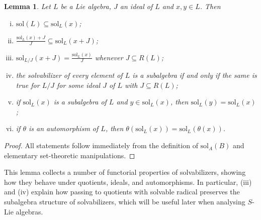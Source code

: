 \documentclass[11pt]{amsart}
\theoremstyle{plain}
\newtheorem{lemma}[theorem]{Lemma}
\def\sol{\mathrm{sol}}
\begin{document}
 
 

\begin{lemma}\label{sol-properties}
Let $L$ be a Lie algebra, $J$ an ideal of $L$ and $x,y\in L$. Then
\begin{enumerate}[(i)]
\item  $\sol(L)\subseteq \sol_L(x)$;
\item  $\frac{\sol_L(x)+J}{J}\subseteq \sol_L(x+J)$;
\item  $\sol_{L/J}(x+J)=\frac{\sol_L(x)}{J}$ whenever $J\subseteq R(L)$;
\item  the solvabilizer of every element of $L$ is a subalgebra if and only if the same is true for $L/J$ for some ideal $J$ of $L$ with $J\subseteq R(L)$;
\item  if $\sol_L(x)$ is a subalgebra of $L$ and $y\in \sol_L(x)$, then $\sol_L(y)=\sol_L(x)$;
\item  if $\theta$ is an automorphism of $L$, then $\theta(\sol_L(x))=\sol_L(\theta(x))$.
\end{enumerate}
\end{lemma}

\begin{proof} 
All statements follow immediately from the definition of $\sol_A(B)$ and elementary set-theoretic manipulations.
\end{proof}

This lemma collects a number of functorial properties of solvabilizers, showing how they behave under quotients, ideals, and automorphisms. In particular, (iii) and (iv) explain how passing to quotients with solvable radical preserves the subalgebra structure of solvabilizers, which will be useful later when analysing $S$-Lie algebras.



\end{document}
